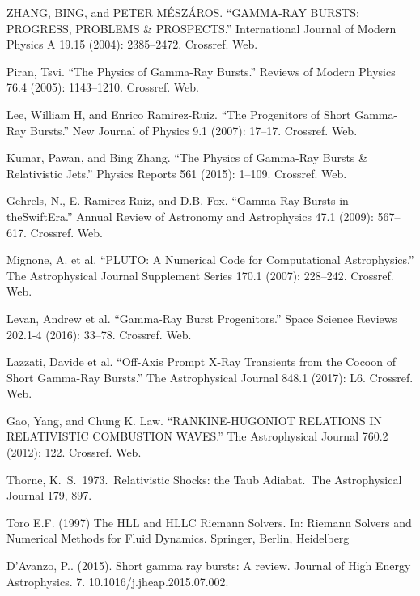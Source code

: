 \documentclass[12pt,a4paper]{book}
\begin{document}
\begin{thebibliography}{20}
ZHANG, BING, and PETER MÉSZÁROS. “GAMMA-RAY BURSTS: PROGRESS, PROBLEMS \& PROSPECTS.” International Journal of Modern Physics A 19.15 (2004): 2385–2472. Crossref. Web.

Piran, Tsvi. “The Physics of Gamma-Ray Bursts.” Reviews of Modern Physics 76.4 (2005): 1143–1210. Crossref. Web.

Lee, William H, and Enrico Ramirez-Ruiz. “The Progenitors of Short Gamma-Ray Bursts.” New Journal of Physics 9.1 (2007): 17–17. Crossref. Web.

Kumar, Pawan, and Bing Zhang. “The Physics of Gamma-Ray Bursts \& Relativistic Jets.” Physics Reports 561 (2015): 1–109. Crossref. Web.

Gehrels, N., E. Ramirez-Ruiz, and D.B. Fox. “Gamma-Ray Bursts in theSwiftEra.” Annual Review of Astronomy and Astrophysics 47.1 (2009): 567–617. Crossref. Web.

Mignone, A. et al. “PLUTO: A Numerical Code for Computational Astrophysics.” The Astrophysical Journal Supplement Series 170.1 (2007): 228–242. Crossref. Web.

Levan, Andrew et al. “Gamma-Ray Burst Progenitors.” Space Science Reviews 202.1-4 (2016): 33–78. Crossref. Web.

Lazzati, Davide et al. “Off-Axis Prompt X-Ray Transients from the Cocoon of Short Gamma-Ray Bursts.” The Astrophysical Journal 848.1 (2017): L6. Crossref. Web.

Gao, Yang, and Chung K. Law. “RANKINE-HUGONIOT RELATIONS IN RELATIVISTIC COMBUSTION WAVES.” The Astrophysical Journal 760.2 (2012): 122. Crossref. Web.

 Thorne, K.~S.\ 1973.\ Relativistic Shocks: the Taub Adiabat.\ The Astrophysical Journal 179, 897.

Toro E.F. (1997) The HLL and HLLC Riemann Solvers. In: Riemann Solvers and Numerical Methods for Fluid Dynamics. Springer, Berlin, Heidelberg

D'Avanzo, P.. (2015). Short gamma ray bursts: A review. Journal of High Energy Astrophysics. 7. 10.1016/j.jheap.2015.07.002. 
\end{thebibliography}
\end{document}
